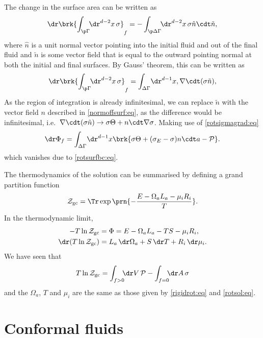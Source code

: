 \documentclass[12pt]{article}
\newcommand{\ploc}{\mathcal{P}}
\newcommand{\mg}{\mu}
\newcommand{\gpf}{\mathcal{Z}_\mathrm{gc}}
\newcommand{\aint}{\int_{\p\Gamma}\!\!\dr^{d-2}x}
\newcommand{\dvint}{\int_{\Delta\Gamma}\!\dr^{d-1}x}
\newcommand{\daint}{\int_{\p\Delta\Gamma}\!\!\dr^{d-2}x}
\begin{document}
The change in the surface area can be written as
%
\begin{equation*}
  \dr\brk{\aint\,\sigma}_f = -\daint\,\sigma \hat{n}\cdt\tilde{n},
\end{equation*}
%
where $\hat{n}$ is a unit normal vector pointing into the initial fluid and out of the final fluid and $\tilde{n}$ is some vector field that is equal to the outward pointing normal at both the initial and final surfaces. By Gauss' theorem, this can be written as
%
\begin{equation*}
  \dr\brk{\aint\,\sigma}_f= \dvint, \nabla\cdt(\sigma\tilde{n}),
\end{equation*}
%
As the region of integration is already infinitesimal, we can replace $\tilde{n}$ with the vector field $n$ described in \eqref{normoffsurf:eq}, as the difference would be infinitesimal, i.e.\ $\nabla\cdt(\sigma\tilde{n}) \to \sigma\Theta + n\cdt\nabla\sigma$.
Making use of \eqref{rotsigmagrad:eq}
%
\begin{equation*}
  \dr\Phi_f = \dvint\brk{\sigma\Theta + (\sigma_E-\sigma)n\cdt a - \ploc}.
\end{equation*}
%
which vanishes due to \eqref{rotsurfbc:eq}.

The thermodynamics of the solution can be summarised by defining a grand partition function
%
\begin{equation}\label{gpf:eq}
  \gpf = \Tr\exp\prn{-\frac{E -\Omega_a L_a  - \mg_i R_i}{T}}.
\end{equation}
%
In the thermodynamic limit,
%
\begin{equation}\label{gpftherm:eq}
  \begin{split}
    -T\ln\gpf &= \Phi = E -\Omega_a L_a - T S - \mg_i R_i, \\
    \dr(T\ln\gpf) &= L_a \,\dr \Omega_a + S \,\dr T + R_i \,\dr \mg_i.
  \end{split}
\end{equation}
%
We have seen that
%
\begin{equation}\label{gpfrot:eq}
  T\ln\gpf = \int_{f>0}\!\!\!\dr V \,\ploc - \int_{f=0}\!\!\!\dr A \,\sigma
\end{equation}
%
and the $\Omega_a$, $T$ and $\mg_i$ are the same as those given by \eqref{rigidrot:eq} and \eqref{rotsol:eq}.



\section{Conformal fluids}\label{sec:Conformal}
\end{document}
